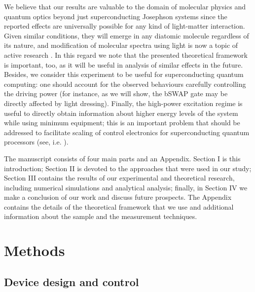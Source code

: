 \documentclass[%
 aps, prx,
 amsmath,amssymb,
 reprint,%
superscriptaddress
]{revtex4-2}
\begin{document}
We believe that our results are valuable to the domain of molecular physics and quantum optics beyond just superconducting Josephson systems since the reported effects are universally possible for any kind of light-matter interaction. Given similar conditions, they will emerge in any diatomic molecule regardless of its nature, and modification of molecular spectra using light is now a topic of active research \cite{hertzog2019strong}. In this regard we note that the presented theoretical framework is important, too, as it will be useful in analysis of similar effects in the future. Besides, we consider this experiment to be useful for superconducting quantum 
computing: one should account for 
the observed behaviours carefully controlling the 
driving power (for instance, as we will show, the 
bSWAP gate \cite{poletto2012entanglement} may be 
directly affected by light dressing). Finally, the high-power excitation regime is useful to directly obtain information about higher energy levels of the system while using minimum equipment; this is an important problem that should be addressed to facilitate scaling of control electronics for superconducting quantum processors (see, i.e. \cite{hornibrook2015cryogenic}).

The manuscript consists of four main parts and an 
Appendix. Section I is this introduction; Section 
II is devoted to the approaches that were used in 
our study; Section III contains the results of 
our experimental and theoretical research, 
including numerical simulations and analytical 
analysis; finally, in Section IV we make a 
conclusion of our work and discuss future 
prospects. The Appendix contains the 
details of the theoretical framework that we use and additional information about the sample and the measurement techniques.

\section{Methods}\label{sec:methods}

\subsection{Device design and control}
\end{document}
